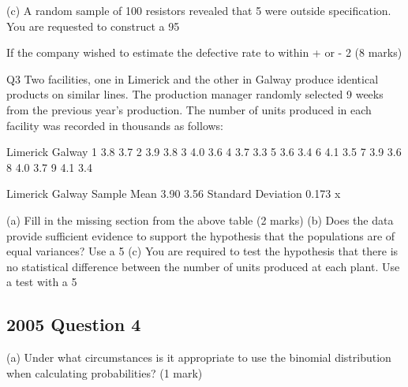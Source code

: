 (c)	A random sample of 100 resistors revealed that 5 were outside specification.  You are requested to construct a 95%

If the company wished to estimate the defective rate to within + or - 2%
										(8 marks)


 

Q3
Two facilities, one in Limerick and the other in Galway produce identical products on similar lines.  The production manager randomly selected 9 weeks from the previous year’s production.  The number of units produced in each facility was recorded in thousands as follows:

	Limerick	Galway
1	3.8	3.7
2	3.9	3.8
3	4.0	3.6
4	3.7	3.3
5	3.6	3.4
6	4.1	3.5
7	3.9	3.6
8	4.0	3.7
9	4.1	3.4



	Limerick	Galway
Sample Mean	3.90	3.56
Standard Deviation	0.173	x
	
(a)	Fill in the missing section from the above table			(2 marks)
(b)	Does the data provide sufficient evidence to support the hypothesis that the populations are of equal variances?  Use a 5%
(c)	You are required to test the hypothesis that there is no statistical difference between the number of units produced at each plant.  Use a test with a 5%


\subsection{2005 Question 4}
(a)	Under what circumstances is it appropriate to use the binomial distribution when calculating probabilities?					(1 mark)

